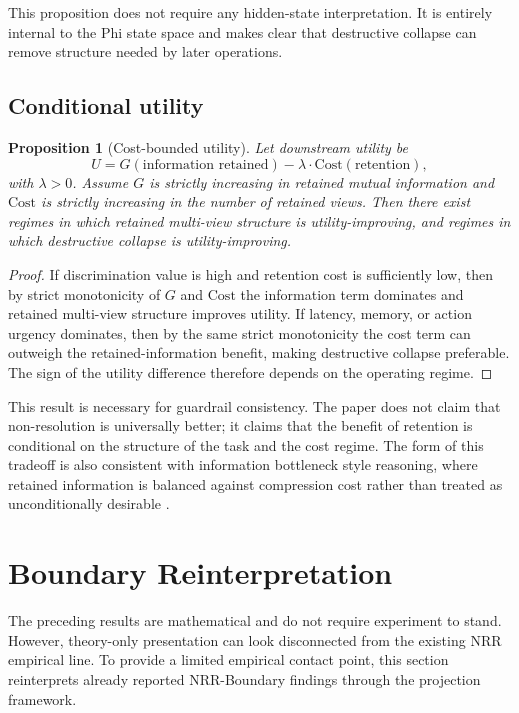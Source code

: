 \documentclass[11pt,a4paper]{article}
\newtheorem{proposition}{Proposition}
\begin{document}
This proposition does not require any hidden-state interpretation. It is entirely internal to the Phi state space and makes clear that destructive collapse can remove structure needed by later operations.

\subsection{Conditional utility}

\begin{proposition}[Cost-bounded utility]
\label{prop:utility}
Let downstream utility be
\begin{equation}
U = G(\text{information retained}) - \lambda \cdot \text{Cost}(\text{retention}),
\end{equation}
with $\lambda > 0$. Assume $G$ is strictly increasing in retained mutual information and $\text{Cost}$ is strictly increasing in the number of retained views. Then there exist regimes in which retained multi-view structure is utility-improving, and regimes in which destructive collapse is utility-improving.
\end{proposition}

\begin{proof}
If discrimination value is high and retention cost is sufficiently low, then by strict monotonicity of $G$ and $\text{Cost}$ the information term dominates and retained multi-view structure improves utility. If latency, memory, or action urgency dominates, then by the same strict monotonicity the cost term can outweigh the retained-information benefit, making destructive collapse preferable. The sign of the utility difference therefore depends on the operating regime.
\end{proof}

This result is necessary for guardrail consistency. The paper does not claim that non-resolution is universally better; it claims that the benefit of retention is conditional on the structure of the task and the cost regime. The form of this tradeoff is also consistent with information bottleneck style reasoning, where retained information is balanced against compression cost rather than treated as unconditionally desirable \cite{tishby1999information}.

\section{Boundary Reinterpretation}
\label{sec:boundary}

The preceding results are mathematical and do not require experiment to stand. However, theory-only presentation can look disconnected from the existing NRR empirical line. To provide a limited empirical contact point, this section reinterprets already reported NRR-Boundary findings \cite{saito2026boundary} through the projection framework.
\end{document}
